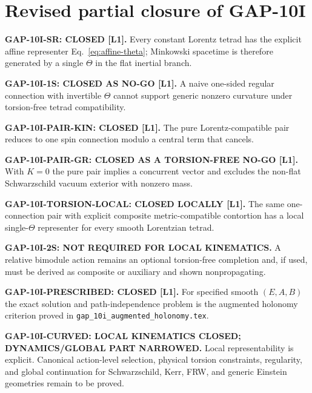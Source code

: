 \documentclass[12pt,a4paper]{article}
\theoremstyle{remark}\newtheorem{remark}[definition]{Remark}
\begin{document}
\section{Revised partial closure of GAP-10I}
\begin{tcolorbox}[colback=green!6!white,colframe=green!55!black,title=Defensible status]
\textbf{GAP-10I-SR: CLOSED [L1].}  Every constant Lorentz tetrad has the
explicit affine representer Eq.~\eqref{eq:affine-theta}; Minkowski spacetime is
therefore generated by a single $\Theta$ in the flat inertial branch.

\medskip
\textbf{GAP-10I-1S: CLOSED AS NO-GO [L1].}  A naive one-sided regular
connection with invertible $\Theta$ cannot support generic nonzero curvature
under torsion-free tetrad compatibility.

\medskip
\textbf{GAP-10I-PAIR-KIN: CLOSED [L1].}  The pure Lorentz-compatible pair
reduces to one spin connection modulo a central term that cancels.

\medskip
\textbf{GAP-10I-PAIR-GR: CLOSED AS A TORSION-FREE NO-GO [L1].}  With
$K=0$ the pure pair implies a concurrent vector and excludes the non-flat
Schwarzschild vacuum exterior with nonzero mass.

\medskip
\textbf{GAP-10I-TORSION-LOCAL: CLOSED LOCALLY [L1].}  The same one-connection
pair with explicit composite metric-compatible contortion has a local
single-$\Theta$ representer for every smooth Lorentzian tetrad.

\medskip
\textbf{GAP-10I-2S: NOT REQUIRED FOR LOCAL KINEMATICS.}  A relative bimodule
action remains an optional torsion-free completion and, if used, must be
derived as composite or auxiliary and shown nonpropagating.

\medskip
\textbf{GAP-10I-PRESCRIBED: CLOSED [L1].}  For specified smooth
$(E,A,B)$ the exact solution and path-independence problem is the augmented
holonomy criterion proved in
\texttt{gap\_10i\_augmented\_holonomy.tex}.

\medskip
\textbf{GAP-10I-CURVED: LOCAL KINEMATICS CLOSED; DYNAMICS/GLOBAL PART
NARROWED.}  Local representability is explicit.  Canonical action-level
selection, physical torsion constraints, regularity, and global continuation
for Schwarzschild, Kerr, FRW, and generic Einstein geometries remain to be
proved.
\end{tcolorbox}
\end{document}
